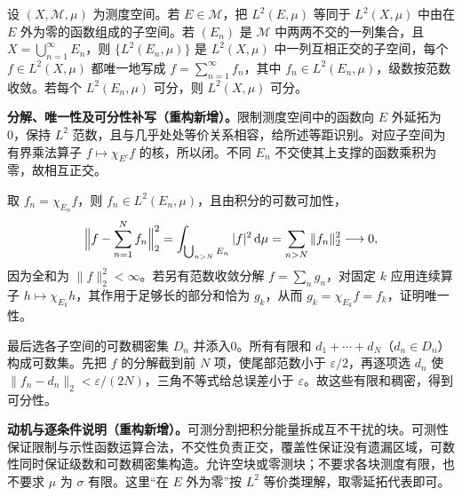 \documentclass[../../main.tex]{subfiles}
\begin{document}
\begin{exercise}\label{exercise:ch05-l2-disjoint-decomposition}
设 $(X,\mathscr M,\mu)$ 为测度空间。若 $E\in\mathscr M$，把 $L^2(E,\mu)$ 等同于 $L^2(X,\mu)$ 中由在 $E$ 外为零的函数组成的子空间。若 $(E_n)$ 是 $\mathscr M$ 中两两不交的一列集合，且 $X=\bigcup_{n=1}^{\infty}E_n$，则 $\{L^2(E_n,\mu)\}$ 是 $L^2(X,\mu)$ 中一列互相正交的子空间，每个 $f\in L^2(X,\mu)$ 都唯一地写成 $f=\sum_{n=1}^{\infty}f_n$，其中 $f_n\in L^2(E_n,\mu)$，级数按范数收敛。若每个 $L^2(E_n,\mu)$ 可分，则 $L^2(X,\mu)$ 可分。
\end{exercise}
\begin{solution}
\textbf{分解、唯一性及可分性补写（重构新增）。}限制测度空间中的函数向 $E$ 外延拓为0，保持 $L^2$ 范数，且与几乎处处等价关系相容，给所述等距识别。对应子空间为有界乘法算子 $f\mapsto\chi_{E^c}f$ 的核，所以闭。不同 $E_n$ 不交使其上支撑的函数乘积为零，故相互正交。

取 $f_n=\chi_{E_n}f$，则 $f_n\in L^2(E_n,\mu)$，且由积分的可数可加性，
\begin{align*}
\Bigl\|f-\sum_{n=1}^Nf_n\Bigr\|_2^2
=\int_{\bigcup_{n>N}E_n}|f|^2\,\mathrm d\mu
=\sum_{n>N}\|f_n\|_2^2\longrightarrow0,
\end{align*}
因为全和为 $\|f\|_2^2<\infty$。若另有范数收敛分解 $f=\sum_ng_n$，对固定 $k$ 应用连续算子 $h\mapsto\chi_{E_k}h$，其作用于足够长的部分和恰为 $g_k$，从而 $g_k=\chi_{E_k}f=f_k$，证明唯一性。

最后选各子空间的可数稠密集 $D_n$ 并添入0。所有有限和 $d_1+\cdots+d_N$（$d_n\in D_n$）构成可数集。先把 $f$ 的分解截到前 $N$ 项，使尾部范数小于 $\varepsilon/2$，再逐项选 $d_n$ 使 $\|f_n-d_n\|_2<\varepsilon/(2N)$，三角不等式给总误差小于 $\varepsilon$。故这些有限和稠密，得到可分性。
\end{solution}
\begin{remark}
\textbf{动机与逐条件说明（重构新增）。}可测分割把积分能量拆成互不干扰的块。可测性保证限制与示性函数运算合法，不交性负责正交，覆盖性保证没有遗漏区域，可数性同时保证级数和可数稠密集构造。允许空块或零测块；不要求各块测度有限，也不要求 $\mu$ 为 $\sigma$ 有限。这里“在 $E$ 外为零”按 $L^2$ 等价类理解，取零延拓代表即可。
\end{remark}
\end{document}
